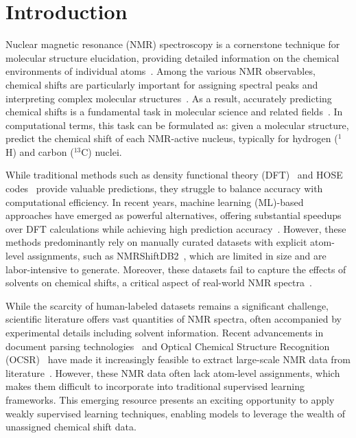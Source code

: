 \section{Introduction}

Nuclear magnetic resonance (NMR) spectroscopy is a cornerstone technique for molecular structure elucidation, providing detailed information on the chemical environments of individual atoms~\cite{clayden2012organic, skoog2019textbook}. Among the various NMR observables, chemical shifts are particularly important for assigning spectral peaks and interpreting complex molecular structures~\cite{smith2010assigning, chen2020review, hu2023machine, jin2025nmr}. As a result, accurately predicting chemical shifts is a fundamental task in molecular science and related fields~\cite{wishart199412, tsai2022ml}. In computational terms, this task can be formulated as: given a molecular structure, predict the chemical shift of each NMR-active nucleus, typically for hydrogen (\( ^1 \)H) and carbon (\( ^{13} \)C) nuclei.


While traditional methods such as density functional theory (DFT)~\cite{wolinski1990giao} and HOSE codes~\cite{bremser1978hose} provide valuable predictions, they struggle to balance accuracy with computational efficiency. 
In recent years, machine learning (ML)-based approaches have emerged as powerful alternatives, offering substantial speedups over DFT calculations while achieving high prediction accuracy~\cite{han2022SGNN, zou2023DetaNet, chen2024gt, xu2025toward}. 
However, these methods predominantly rely on manually curated datasets with explicit atom-level assignments, such as NMRShiftDB2~\cite{kuhn2012chemical, kuhn2015NMRShiftDB2}, which are limited in size and are labor-intensive to generate. 
Moreover, these datasets fail to capture the effects of solvents on chemical shifts, a critical aspect of real-world NMR spectra~\cite{buckingham1960solvent}.

While the scarcity of human-labeled datasets remains a significant challenge, scientific literature offers vast quantities of NMR spectra, often accompanied by experimental details including solvent information. 
Recent advancements in document parsing technologies~\cite{wang2024mineru} and Optical Chemical Structure Recognition (OCSR)~\cite{fang2024molparser} have made it increasingly feasible to extract large-scale NMR data from literature~\cite{wang2025nmrextractor, wang2025nmrexp}. 
However, these NMR data often lack atom-level assignments, which makes them difficult to incorporate into traditional supervised learning frameworks. 
This emerging resource presents an exciting opportunity to apply weakly supervised learning techniques, enabling models to leverage the wealth of unassigned chemical shift data.


